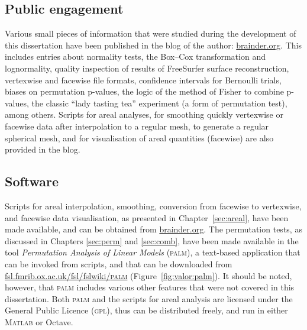 \subsection{Public engagement}

Various small pieces of information that were studied during the development of this dissertation have been published in the blog of the author: \href{http://brainder.org}{brainder.org}. This includes entries about normality tests, the Box--Cox transformation and log\-normality, quality inspection of results of FreeSurfer surface reconstruction, vertexwise and facewise file formats, confidence intervals for Bernoulli trials, biases on permutation p-values, the logic of the method of Fisher to combine p-values, the classic ``lady tasting tea'' experiment (a form of permutation test), among others. Scripts for areal analyses, for smoothing quickly vertexwise or facewise data after interpolation to a regular mesh, to generate a regular spherical mesh, and for visualisation of areal quantities (facewise) are also provided in the blog.

\subsection{Software}

Scripts for areal interpolation, smoothing, conversion from facewise to vertexwise, and facewise data visualisation, as presented in Chapter~\ref{sec:areal}, have been made available, and can be obtained from \href{http://brainder.org}{brainder.org}. The permutation tests, as discussed in Chapters \ref{sec:perm} and \ref{sec:comb}, have been made available in the tool \emph{Permutation Analysis of Linear Models} (\textsc{palm}), a text-based application that can be invoked from scripts, and that can be downloaded from \href{http://fsl.fmrib.ox.ac.uk/fsl/fslwiki/PALM}{fsl.fmrib.ox.ac.uk/fsl/fslwiki/\textsc{palm}} (Figure~\ref{fig:valor:palm}). It should be noted, however, that \textsc{palm} includes various other features that were not covered in this dissertation. Both \textsc{palm} and the scripts for areal analysis are licensed under the General Public Licence (\textsc{gpl}), thus can be distributed freely, and run in either \textsc{Matlab} or Octave.

